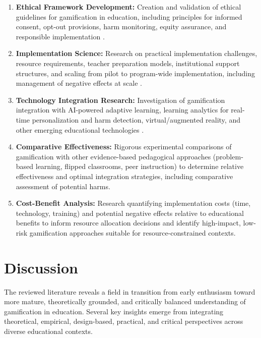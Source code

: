\documentclass[12pt,a4paper]{article}
\begin{document}
\begin{enumerate}
    \item \textbf{Ethical Framework Development:} Creation and validation of ethical guidelines for gamification in education, including principles for informed consent, opt-out provisions, harm monitoring, equity assurance, and responsible implementation \parencite{surendeleg2024}.
    
    \item \textbf{Implementation Science:} Research on practical implementation challenges, resource requirements, teacher preparation models, institutional support structures, and scaling from pilot to program-wide implementation, including management of negative effects at scale \parencite{rodriguez2025}.
    
    \item \textbf{Technology Integration Research:} Investigation of gamification integration with AI-powered adaptive learning, learning analytics for real-time personalization and harm detection, virtual/augmented reality, and other emerging educational technologies \parencite{dahri2024,wang2023}.
    
    \item \textbf{Comparative Effectiveness:} Rigorous experimental comparisons of gamification with other evidence-based pedagogical approaches (problem-based learning, flipped classrooms, peer instruction) to determine relative effectiveness and optimal integration strategies, including comparative assessment of potential harms.
    
    \item \textbf{Cost-Benefit Analysis:} Research quantifying implementation costs (time, technology, training) and potential negative effects relative to educational benefits to inform resource allocation decisions and identify high-impact, low-risk gamification approaches suitable for resource-constrained contexts.
\end{enumerate}



\section{Discussion}

The reviewed literature reveals a field in transition from early enthusiasm toward more mature, theoretically grounded, and critically balanced understanding of gamification in education. Several key insights emerge from integrating theoretical, empirical, design-based, practical, and critical perspectives across diverse educational contexts.
\end{document}
